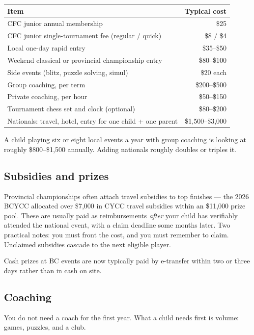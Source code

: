 \documentclass[10pt,letterpaper]{article}
\begin{document}
\begin{center}
\begin{tabular}{@{}lr@{}}
\toprule
\textbf{Item} & \textbf{Typical cost} \\
\midrule
CFC junior annual membership & \$25 \\
CFC junior single-tournament fee (regular / quick) & \$8 / \$4 \\
Local one-day rapid entry & \$35--\$50 \\
Weekend classical or provincial championship entry & \$80--\$100 \\
Side events (blitz, puzzle solving, simul) & \$20 each \\
Group coaching, per term & \$200--\$500 \\
Private coaching, per hour & \$50--\$150 \\
Tournament chess set and clock (optional) & \$80--\$200 \\
Nationals: travel, hotel, entry for one child + one parent & \$1{,}500--\$3{,}000 \\
\bottomrule
\end{tabular}
\end{center}

A child playing six or eight local events a year with group coaching is looking
at roughly \$800--\$1{,}500 annually. Adding nationals roughly doubles or
triples it.

\subsection{Subsidies and prizes}

Provincial championships often attach travel subsidies to top finishes ---
the 2026 BCYCC allocated over \$7{,}000 in CYCC travel subsidies within an
\$11{,}000 prize pool. These are usually paid as reimbursements \emph{after}
your child has verifiably attended the national event, with a claim deadline
some months later. Two practical notes: you must front the cost, and you must
remember to claim. Unclaimed subsidies cascade to the next eligible player.

Cash prizes at BC events are now typically paid by e-transfer within two or three days rather than in cash on site.

\subsection{Coaching}

You do not need a coach for the first year. What a child needs first is volume:
games, puzzles, and a club.
\end{document}
